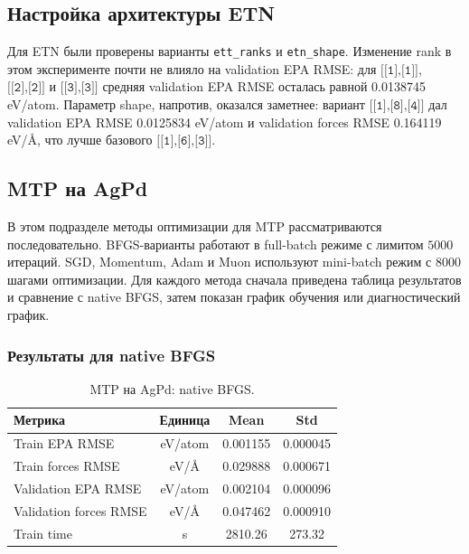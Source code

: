 
\subsection{Настройка архитектуры ETN}

Для ETN были проверены варианты \texttt{ett\_ranks} и \texttt{etn\_shape}. Изменение rank в этом эксперименте почти не влияло на validation EPA RMSE: для \(\texttt{[[1],[1]]}\), \(\texttt{[[2],[2]]}\) и \(\texttt{[[3],[3]]}\) средняя validation EPA RMSE осталась равной 0.0138745 eV/atom. Параметр shape, напротив, оказался заметнее: вариант \(\texttt{[[1],[8],[4]]}\) дал validation EPA RMSE 0.0125834 eV/atom и validation forces RMSE 0.164119 eV/\AA, что лучше базового \(\texttt{[[1],[6],[3]]}\).


\subsection{MTP на AgPd}
\label{subsec:mtp-results}

В этом подразделе методы оптимизации для MTP рассматриваются последовательно. BFGS-варианты работают в full-batch режиме с лимитом \(5000\) итераций. SGD, Momentum, Adam и Muon используют mini-batch режим с \(8000\) шагами оптимизации. Для каждого метода сначала приведена таблица результатов и сравнение с native BFGS, затем показан график обучения или диагностический график.

\subsubsection{Результаты для native BFGS}

\begin{table}[H]
\centering
\small
\caption{MTP на AgPd: native BFGS.}
\label{tab:mtp-native-bfgs}
\begin{tabular}{lccc}
\toprule
Метрика & Единица & Mean & Std \\
\midrule
Train EPA RMSE & eV/atom & 0.001155 & 0.000045 \\
Train forces RMSE & eV/\AA & 0.029888 & 0.000671 \\
Validation EPA RMSE & eV/atom & 0.002104 & 0.000096 \\
Validation forces RMSE & eV/\AA & 0.047462 & 0.000910 \\
Train time & s & 2810.26 & 273.32 \\
\bottomrule
\end{tabular}
\end{table}

